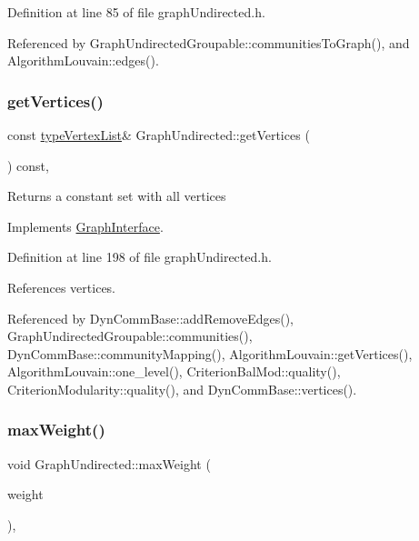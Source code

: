 Definition at line 85 of file graph\+Undirected.\+h.



Referenced by Graph\+Undirected\+Groupable\+::communities\+To\+Graph(), and Algorithm\+Louvain\+::edges().

\mbox{\label{classGraphUndirected_af2f65109919c878a1fd7637d3bfe0991}} 
\subsubsection{\texorpdfstring{get\+Vertices()}{getVertices()}}
{\footnotesize\ttfamily const \hyperlink{graphInterface_8h_a21d54d8a139def524d3b0d6f71ec4974}{type\+Vertex\+List}\& Graph\+Undirected\+::get\+Vertices (\begin{DoxyParamCaption}{ }\end{DoxyParamCaption}) const\hspace{0.3cm}{\ttfamily [inline]}, {\ttfamily [virtual]}}

\begin{DoxyReturn}{Returns}
a constant set with all vertices 
\end{DoxyReturn}


Implements \hyperlink{classGraphInterface_a94af429415c22cba42ecf5a97ee6b5c3}{Graph\+Interface}.



Definition at line 198 of file graph\+Undirected.\+h.



References vertices.



Referenced by Dyn\+Comm\+Base\+::add\+Remove\+Edges(), Graph\+Undirected\+Groupable\+::communities(), Dyn\+Comm\+Base\+::community\+Mapping(), Algorithm\+Louvain\+::get\+Vertices(), Algorithm\+Louvain\+::one\+\_\+level(), Criterion\+Bal\+Mod\+::quality(), Criterion\+Modularity\+::quality(), and Dyn\+Comm\+Base\+::vertices().

\mbox{\label{classGraphUndirected_a99cc719c89bd4afb612cdae920939a00}} 
\subsubsection{\texorpdfstring{max\+Weight()}{maxWeight()}\hspace{0.1cm}{\footnotesize\ttfamily [1/2]}}
{\footnotesize\ttfamily void Graph\+Undirected\+::max\+Weight (\begin{DoxyParamCaption}\item[{const \hyperlink{edge_8h_a2e7ea3be891ac8b52f749ec73fee6dd2}{type\+Weight} \&}]{weight }\end{DoxyParamCaption})\hspace{0.3cm}{\ttfamily [inline]}, {\ttfamily [private]}}



